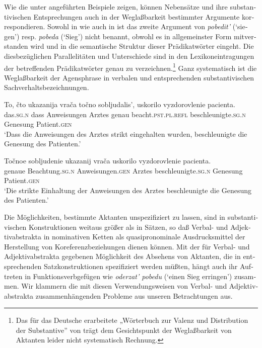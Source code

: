 \documentclass[output=paper]{langscibook}
\begin{document}
\begin{otherlanguage}{german}
Wie die unter  angeführten Beispiele zeigen, können Nebensätze und ihre substantivischen Entsprechungen auch in der Weglaßbarkeit bestimmter Argumente korrespondieren. Sowohl in  wie auch in  ist das zweite Argument von \textit{pobedit’} (‘siegen’) resp. \textit{pobeda} (‘Sieg’) nicht benannt, obwohl es in allgemeinster Form mitverstanden wird und in die semantische Struktur dieser Prädikatwörter eingeht. Die diesbezüglichen Parallelitäten und Unterschiede sind in den Lexikoneintragungen der betreffenden Prädikatwörter genau zu verzeichnen.\footnote{Das für das Deutsche erarbeitete „Wörterbuch zur Valenz und Distribution der Substantive” von \citet{sommerfeldt1977worterbuch-zur-valenz-und-distribution-der-substantive} trägt dem Gesichtspunkt der Weglaßbarkeit von Aktanten leider nicht systematisch Rechnung.} Ganz systematisch ist die Weglaßbarkeit der Agensphrase in verbalen und entsprechenden substantivischen Sachverhaltsbezeichnungen.

\begin{exe}
     \label{ex:zi83:1'}
        \ea \label{ex:zi83:1'a}
        \gll To, čto ukazanija vrača točno sobljudalis’, uskorilo vyzdorovlenie pacienta. \\
        das.\textsc{sg}.\textsc{n} dass Anweisungen Arztes genau beacht.\textsc{pst}.\textsc{pl}.\textsc{refl}  beschleunigte.\textsc{sg}.\textsc{n}  Genesung  Patient.\textsc{gen} \\
        \glt ‘Dass die Anweisungen des Arztes strikt eingehalten wurden, beschleunigte die Genesung des Patienten.’
        
        \ex \label{ex:zi83:1'b}
        \gll Točnoe sobljudenie ukazanij vrača uskorilo vyzdorovlenie pacienta.\\
        genaue Beachtung.\textsc{sg}.\textsc{n}  Anweisungen.\textsc{gen}  Arztes beschleunigte.\textsc{sg}.\textsc{n}  Genesung  Patient.\textsc{gen}\\
            \glt ‘Die strikte Einhaltung der Anweisungen des Arztes beschleunigte die Genesung des Patienten.’
        \z
\end{exe}

\noindent Die Möglichkeiten, bestimmte Aktanten unspezifiziert zu lassen, sind in substantivischen Konstruktionen weitaus größer als in Sätzen, so daß Verbal- und Adjektivabstrakta in nominativen Ketten als quasipronominale Ausdrucksmittel der Herstellung von Koreferenzbeziehungen dienen können. Mit der für Verbal- und Adjektivabstrakta gegebenen Möglichkeit des Absehens von Aktanten, die in entsprechenden Satzkonstruktionen spezifiziert werden müßten, hängt auch ihr Auftreten in Funktionsverbgefügen wie \textit{oderzat’ pobedu} (‘einen Sieg erringen’) zusammen. Wir klammern die mit diesen Verwendungsweisen von Verbal- und Adjektivabstrakta zusammenhängenden Probleme aus unseren Betrachtungen aus.


\end{otherlanguage}
\end{document}
